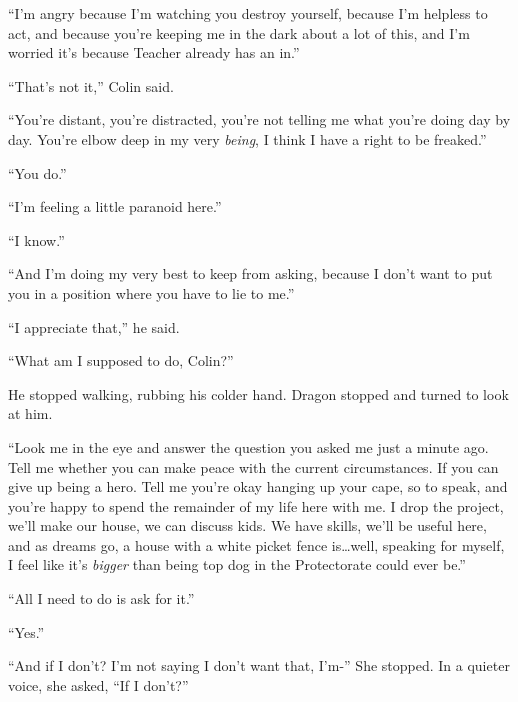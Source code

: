 ``I'm angry because I'm watching you destroy yourself, because I'm helpless to act, and because you're keeping me in the dark about a lot of this, and I'm worried it's because Teacher already has an in.''



``That's not it,'' Colin said.



``You're distant, you're distracted, you're not telling me what you're doing day by day.  You're elbow deep in my very \emph{being}, I think I have a right to be freaked.''



``You do.''



``I'm feeling a little paranoid here.''



``I know.''



``And I'm doing my very best to keep from asking, because I don't want to put you in a position where you have to lie to me.''



``I appreciate that,'' he said.



``What am I supposed to do, Colin?''



He stopped walking, rubbing his colder hand.  Dragon stopped and turned to look at him.



``Look me in the eye and answer the question you asked me just a minute ago.  Tell me whether you can make peace with the current circumstances.  If you can give up being a hero.  Tell me you're okay hanging up your cape, so to speak, and you're happy to spend the remainder of my life here with me.  I drop the project, we'll make our house, we can discuss kids.  We have skills, we'll be useful here, and as dreams go, a house with a white picket fence is\ldots well, speaking for myself, I feel like it's \emph{bigger} than being top dog in the Protectorate could ever be.''



``All I need to do is ask for it.''



``Yes.''



``And if I don't?  I'm not saying I don't want that, I'm-'' She stopped.  In a quieter voice, she asked, ``If I don't?''




